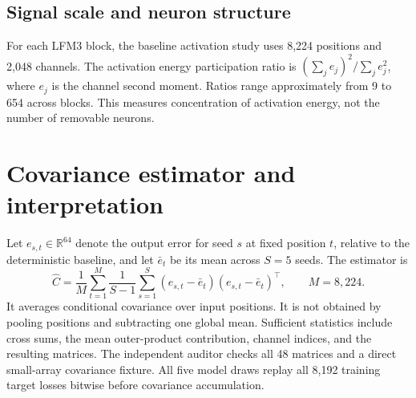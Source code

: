 \documentclass[11pt]{article}
\begin{document}

\subsection{Signal scale and neuron structure}
For each LFM3 block, the baseline activation study uses 8,224 positions and 2,048 channels. The activation energy participation ratio is $(\sum_j e_j)^2/\sum_j e_j^2$, where $e_j$ is the channel second moment. Ratios range approximately from 9 to 654 across blocks. This measures concentration of activation energy, not the number of removable neurons.



\section{Covariance estimator and interpretation}
Let $e_{s,t}\in\mathbb R^{64}$ denote the output error for seed $s$ at fixed position $t$, relative to the deterministic baseline, and let $\bar e_t$ be its mean across $S=5$ seeds. The estimator is
\begin{equation}
 \widehat C=\frac1M\sum_{t=1}^{M}\frac1{S-1}
 \sum_{s=1}^{S}(e_{s,t}-\bar e_t)(e_{s,t}-\bar e_t)^\top,
 \qquad M=8{,}224.
\end{equation}
It averages conditional covariance over input positions. It is not obtained by pooling positions and subtracting one global mean. Sufficient statistics include cross sums, the mean outer-product contribution, channel indices, and the resulting matrices. The independent auditor checks all 48 matrices and a direct small-array covariance fixture. All five model draws replay all 8,192 training target losses bitwise before covariance accumulation.
\end{document}
